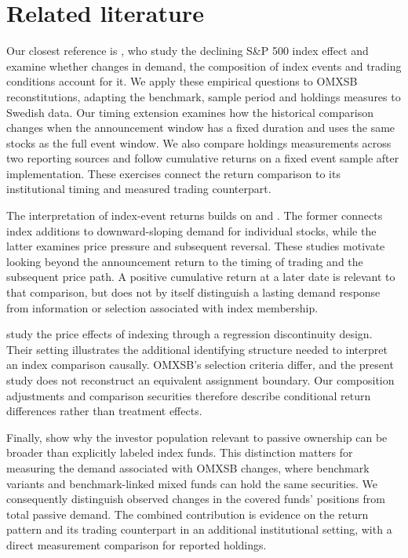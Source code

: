 \section{Related literature}

Our closest reference is \citet{greenwood2025}, who study the declining S\&P 500 index effect and examine whether changes in demand, the composition of index events and trading conditions account for it. We apply these empirical questions to OMXSB reconstitutions, adapting the benchmark, sample period and holdings measures to Swedish data. Our timing extension examines how the historical comparison changes when the announcement window has a fixed duration and uses the same stocks as the full event window. We also compare holdings measurements across two reporting sources and follow cumulative returns on a fixed event sample after implementation. These exercises connect the return comparison to its institutional timing and measured trading counterpart.

The interpretation of index-event returns builds on \citet{shleifer1986} and \citet{harris1986}. The former connects index additions to downward-sloping demand for individual stocks, while the latter examines price pressure and subsequent reversal. These studies motivate looking beyond the announcement return to the timing of trading and the subsequent price path. A positive cumulative return at a later date is relevant to that comparison, but does not by itself distinguish a lasting demand response from information or selection associated with index membership.

\citet{chang2015} study the price effects of indexing through a regression discontinuity design. Their setting illustrates the additional identifying structure needed to interpret an index comparison causally. OMXSB's selection criteria differ, and the present study does not reconstruct an equivalent assignment boundary. Our composition adjustments and comparison securities therefore describe conditional return differences rather than treatment effects.

Finally, \citet{chinco2024} show why the investor population relevant to passive ownership can be broader than explicitly labeled index funds. This distinction matters for measuring the demand associated with OMXSB changes, where benchmark variants and benchmark-linked mixed funds can hold the same securities. We consequently distinguish observed changes in the covered funds' positions from total passive demand. The combined contribution is evidence on the return pattern and its trading counterpart in an additional institutional setting, with a direct measurement comparison for reported holdings.
